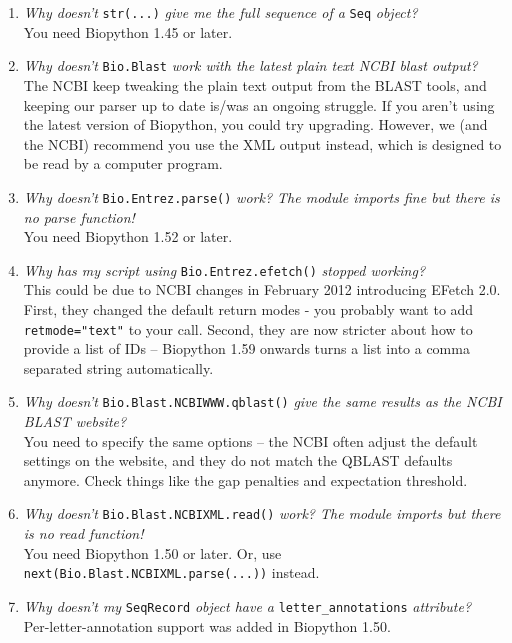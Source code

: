 \begin{enumerate}
  \item \emph{Why doesn't} \verb|str(...)| \emph{give me the full sequence of a} \verb|Seq| \emph{object?} \\
  You need Biopython 1.45 or later.

  \item \emph{Why doesn't} \verb|Bio.Blast| \emph{work with the latest plain text NCBI blast output?} \\
  The NCBI keep tweaking the plain text output from the BLAST tools, and keeping our parser up to date is/was an ongoing struggle.
  If you aren't using the latest version of Biopython, you could try upgrading.
  However, we (and the NCBI) recommend you use the XML output instead, which is designed to be read by a computer program.

  \item \emph{Why doesn't} \verb|Bio.Entrez.parse()| \emph{work? The module imports fine but there is no parse function!} \\
  You need Biopython 1.52 or later.

  \item \emph{Why has my script using} \verb|Bio.Entrez.efetch()| \emph{stopped working?} \\
  This could be due to NCBI changes in February 2012 introducing EFetch 2.0.
  First, they changed the default return modes - you probably want to add \verb|retmode="text"| to
  your call.
  Second, they are now stricter about how to provide a list of IDs -- Biopython 1.59 onwards
  turns a list into a comma separated string automatically.

  \item \emph{Why doesn't} \verb|Bio.Blast.NCBIWWW.qblast()| \emph{give the same results as the NCBI BLAST website?} \\
  You need to specify the same options -- the NCBI often adjust the default settings on the website,
  and they do not match the QBLAST defaults anymore. Check things like the gap penalties and expectation threshold.

  \item \emph{Why doesn't} \verb|Bio.Blast.NCBIXML.read()| \emph{work? The module imports but there is no read function!} \\
  You need Biopython 1.50 or later.  Or, use \texttt{next(Bio.Blast.NCBIXML.parse(...))} instead.

  \item \emph{Why doesn't my} \verb|SeqRecord| \emph{object have a} \verb|letter_annotations| \emph{attribute?} \\
  Per-letter-annotation support was added in Biopython 1.50.


\end{enumerate}
